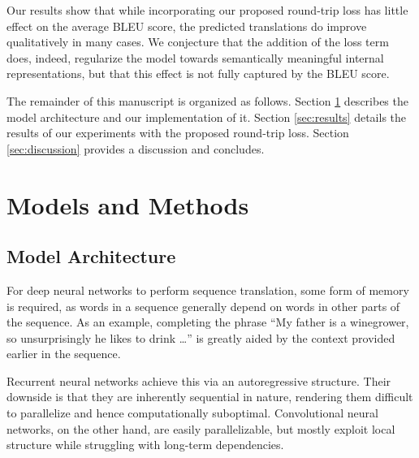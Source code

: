 \documentclass[10pt,a4paper]{article}
\begin{document}
Our results show that while incorporating our proposed round-trip loss has little effect on the average BLEU score, the predicted translations do improve qualitatively in many cases. We conjecture that the addition of the loss term does, indeed, regularize the model towards semantically meaningful internal representations, but that this effect is not fully captured by the BLEU score.

The remainder of this manuscript is organized as follows. Section \ref{sec:models} describes the model architecture and our implementation of it. Section \ref{sec:results} details the results of our experiments with the proposed round-trip loss. Section \ref{sec:discussion} provides a discussion and concludes.

\section{Models and Methods}\label{sec:models}
\subsection{Model Architecture}
For deep neural networks to perform sequence translation, some form of memory is required, as words in a sequence generally depend on words in other parts of the sequence. As an example, completing  the phrase ``My father is a winegrower, so unsurprisingly he likes to drink \ldots'' is greatly aided by the context provided earlier in the sequence.

Recurrent neural networks achieve this via an autoregressive structure. Their downside is that they are inherently sequential in nature, rendering them difficult to parallelize and hence computationally suboptimal.
Convolutional neural networks, on the other hand, are easily parallelizable, but mostly exploit local structure while struggling with long-term dependencies. 
\end{document}
